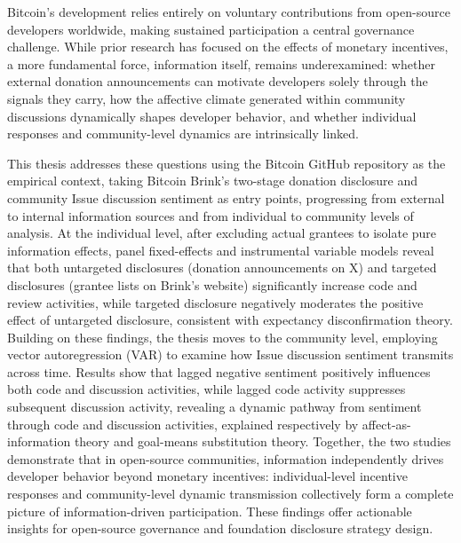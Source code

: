 \documentclass[
    type = master, %
    degree = professional,        %
    decl-page,  %
    twoside,                %
    fontset = fandol %
  ]{njuthesis}
\begin{document}
\begin{abstract*}
Bitcoin's development relies entirely on voluntary contributions from open-source developers worldwide, making sustained participation a central governance challenge. While prior research has focused on the effects of monetary incentives, a more fundamental force, information itself, remains underexamined: whether external donation announcements can motivate developers solely through the signals they carry, how the affective climate generated within community discussions dynamically shapes developer behavior, and whether individual responses and community-level dynamics are intrinsically linked.

This thesis addresses these questions using the Bitcoin GitHub repository as the empirical context, taking Bitcoin Brink's two-stage donation disclosure and community Issue discussion sentiment as entry points, progressing from external to internal information sources and from individual to community levels of analysis. At the individual level, after excluding actual grantees to isolate pure information effects, panel fixed-effects and instrumental variable models reveal that both untargeted disclosures (donation announcements on X) and targeted disclosures (grantee lists on Brink's website) significantly increase code and review activities, while targeted disclosure negatively moderates the positive effect of untargeted disclosure, consistent with expectancy disconfirmation theory. Building on these findings, the thesis moves to the community level, employing vector autoregression (VAR) to examine how Issue discussion sentiment transmits across time. Results show that lagged negative sentiment positively influences both code and discussion activities, while lagged code activity suppresses subsequent discussion activity, revealing a dynamic pathway from sentiment through code and discussion activities, explained respectively by affect-as-information theory and goal-means substitution theory. Together, the two studies demonstrate that in open-source communities, information independently drives developer behavior beyond monetary incentives: individual-level incentive responses and community-level dynamic transmission collectively form a complete picture of information-driven participation. These findings offer actionable insights for open-source governance and foundation disclosure strategy design.
\end{abstract*}

\tableofcontents
\listoffigures
\listoftables
\end{document}
